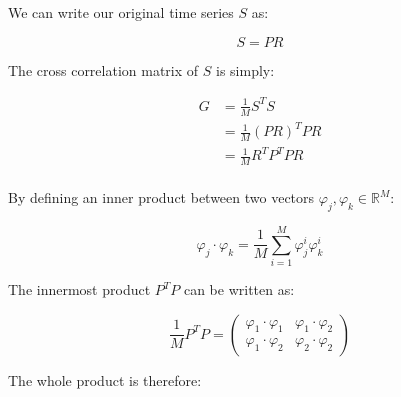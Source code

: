 \documentclass[11pt]{article}
\begin{document}
We can write our original time series \(S\) as:

\[S = PR\]

The cross correlation matrix of \(S\) is simply:

\begin{align*}
G &= \frac{1}{M} S^T S \\
  &= \frac{1}{M} \left( PR \right)^T PR \\
  &= \frac{1}{M} R^T P^T PR \\
\end{align*}

By defining an inner product between two vectors \(\varphi_j, \varphi_k \in \mathbb{R}^M\):

\[\varphi_j \cdot \varphi_k = \frac{1}{M} \sum_{i=1}^{M} \varphi_j^i \varphi_k^i\]

The innermost product \(P^T P\) can be written as:

\begin{equation*}
\frac{1}{M} P^T P =
\begin{pmatrix}
\varphi_1 \cdot \varphi_1 & \varphi_1 \cdot \varphi_2 \\
\varphi_1 \cdot \varphi_2 & \varphi_2 \cdot \varphi_2
\end{pmatrix}
\end{equation*}

The whole product is therefore:
\end{document}

